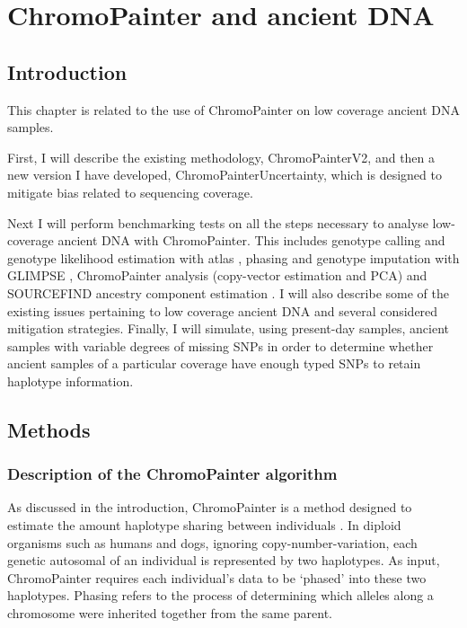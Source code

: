 \chapter{ChromoPainter and ancient DNA}
\label{chapterlabel2}

\section{Introduction}

This chapter is related to the use of ChromoPainter on low coverage ancient DNA samples. 

First, I will describe the existing methodology, ChromoPainterV2, and then a new version I have developed, ChromoPainterUncertainty, which is designed to mitigate bias related to sequencing coverage. 

Next I will perform benchmarking tests on all the steps necessary to analyse low-coverage ancient DNA with ChromoPainter. This includes genotype calling and genotype likelihood estimation with atlas \cite{Link2017}, phasing and genotype imputation with GLIMPSE \cite{rubinacci2021efficient}, ChromoPainter \cite{Lawson2012} analysis (copy-vector estimation and PCA) and SOURCEFIND ancestry component estimation \cite{Chacon-Duque2018}. I will also describe some of the existing issues pertaining to low coverage ancient DNA and several considered mitigation strategies. Finally, I will simulate, using present-day samples, ancient samples with variable degrees of missing SNPs in order to determine whether ancient samples of a particular coverage have enough typed SNPs to retain haplotype information.   

\section{Methods}

\subsection{Description of the ChromoPainter algorithm} \label{sec:ChromopainterDescription}

As discussed in the introduction, ChromoPainter is a method designed to estimate the amount haplotype sharing between individuals \cite{Lawson2012}. In diploid organisms such as humans and dogs, ignoring copy-number-variation, each genetic autosomal of an individual is represented by two haplotypes. As input, ChromoPainter requires each individual's data to be `phased' into these two haplotypes. Phasing refers to the process of determining which alleles along a chromosome were inherited together from the same parent. 

